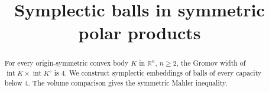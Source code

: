 \documentclass[11pt,a4paper]{amsart}
\title{Symplectic balls in symmetric polar products}
\author{}
\date{}
\begin{document}
\begin{abstract}
For every origin-symmetric convex body $K$ in $\mathbb{R}^n$, $n\geq2$, the Gromov width of $\operatorname{int}K\times\operatorname{int}K^\circ$ is $4$. We construct symplectic embeddings of balls of every capacity below $4$. The volume comparison gives the symmetric Mahler inequality.
\end{abstract}

\maketitle







\printbibliography
\end{document}
